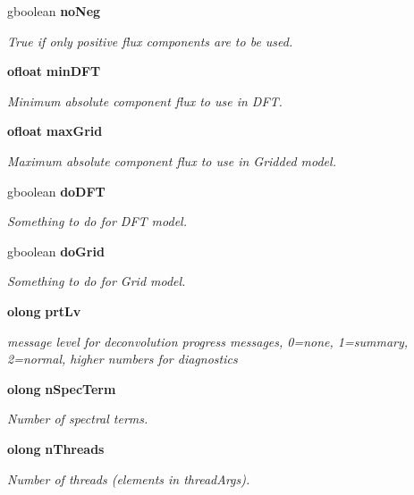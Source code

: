 \begin{CompactItemize}
gboolean {\bf no\-Neg}
\begin{CompactList}\small\item\em True if only positive flux components are to be used. \item\end{CompactList}\item 
{\bf ofloat} {\bf min\-DFT}
\begin{CompactList}\small\item\em Minimum absolute component flux to use in DFT. \item\end{CompactList}\item 
{\bf ofloat} {\bf max\-Grid}
\begin{CompactList}\small\item\em Maximum absolute component flux to use in Gridded model. \item\end{CompactList}\item 
gboolean {\bf do\-DFT}
\begin{CompactList}\small\item\em Something to do for DFT model. \item\end{CompactList}\item 
gboolean {\bf do\-Grid}
\begin{CompactList}\small\item\em Something to do for Grid model. \item\end{CompactList}\item 
{\bf olong} {\bf prt\-Lv}
\begin{CompactList}\small\item\em message level for deconvolution progress messages, 0=none, 1=summary, 2=normal, higher numbers for diagnostics \item\end{CompactList}\item 
{\bf olong} {\bf n\-Spec\-Term}
\begin{CompactList}\small\item\em Number of spectral terms. \item\end{CompactList}\item 
{\bf olong} {\bf n\-Threads}
\begin{CompactList}\small\item\em Number of threads (elements in thread\-Args). \item\end{CompactList}\item 

\end{CompactItemize}
